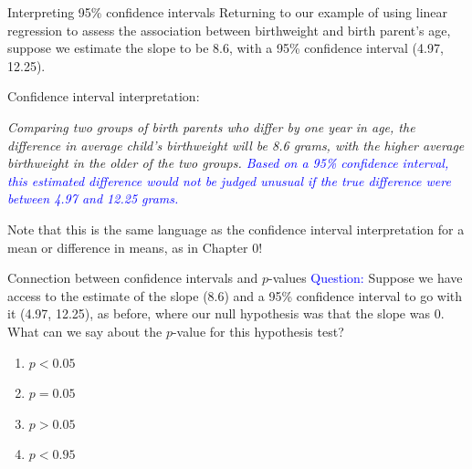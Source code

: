\documentclass[10pt,t]{beamer}
\begin{document}
\begin{frame}{Interpreting 95\% confidence intervals}
Returning to our example of using linear regression to assess the association between birthweight and birth parent's age, suppose we estimate the slope to be 8.6, with a 95\% confidence interval (4.97, 12.25).

\vspace{0.3cm}

Confidence interval interpretation:

\vspace{0.3cm}

\textit{Comparing two groups of birth parents who differ by one year in age, the difference in average child's birthweight will be 8.6 grams, with the higher average birthweight in the older of the two groups. \textcolor{blue}{Based on a 95\% confidence interval, this estimated difference would not be judged unusual if the true difference were between 4.97 and 12.25 grams.}}

\vspace{0.3cm}

\small Note that this is the same language as the confidence interval interpretation for a mean or difference in means, as in Chapter 0!

\end{frame}

\begin{frame}{Connection between confidence intervals and $p$-values}
\textcolor{blue}{Question:} Suppose we have access to the estimate of the slope (8.6) and a 95\% confidence interval to go with it (4.97, 12.25), as before, where our null hypothesis was that the slope was $0$. What can we say about the $p$-value for this hypothesis test?

\vspace{0.3cm}

\begin{enumerate}
	\item $p < 0.05$
	\item $p = 0.05$
	\item $p > 0.05$
	\item $p < 0.95$
\end{enumerate}

\end{frame}
\end{document}
